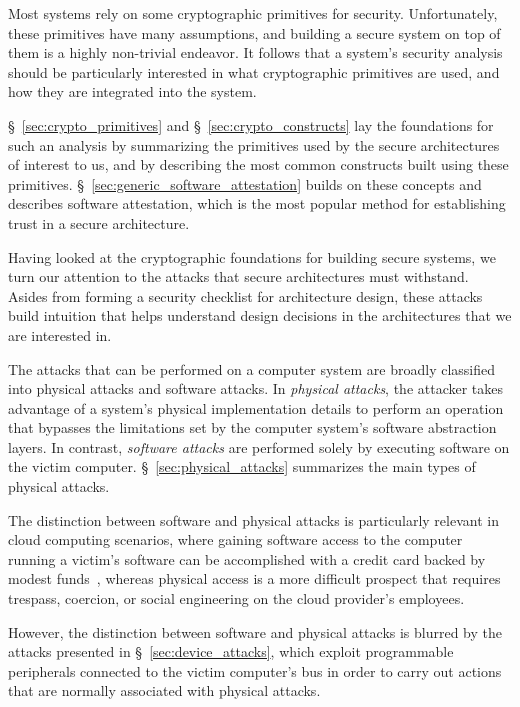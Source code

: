 \label{sec:security_background}

Most systems rely on some cryptographic primitives for security. Unfortunately,
these primitives have many assumptions, and building a secure system on top of
them is a highly non-trivial endeavor. It follows that a system's security
analysis should be particularly interested in what cryptographic primitives are
used, and how they are integrated into the system.

\S~\ref{sec:crypto_primitives} and \S~\ref{sec:crypto_constructs} lay the
foundations for such an analysis by summarizing the primitives used by the
secure architectures of interest to us, and by describing the most
common constructs built using these primitives.
\S~\ref{sec:generic_software_attestation} builds on these concepts and
describes software attestation, which is the most popular method for
establishing trust in a secure architecture.

Having looked at the cryptographic foundations for building secure systems, we
turn our attention to the attacks that secure architectures must withstand.
Asides from forming a security checklist for architecture design, these attacks
build intuition that helps understand design decisions in the architectures
that we are interested in.

The attacks that can be performed on a computer system are broadly classified
into physical attacks and software attacks. In \textit{physical attacks}, the
attacker takes advantage of a system's physical implementation details to
perform an operation that bypasses the limitations set by the computer
system's software abstraction layers. In contrast, \textit{software attacks}
are performed solely by executing software on the victim computer.
\S~\ref{sec:physical_attacks} summarizes the main types of physical attacks.

The distinction between software and physical attacks is particularly relevant
in cloud computing scenarios, where gaining software access to the computer
running a victim's software can be accomplished with a credit card backed by
modest funds~\cite{ristenpart2009colocation}, whereas physical access is a
more difficult prospect that requires trespass, coercion, or social engineering
on the cloud provider's employees.

However, the distinction between software and physical attacks is blurred by
the attacks presented in \S~\ref{sec:device_attacks}, which exploit
programmable peripherals connected to the victim computer's bus in order to
carry out actions that are normally associated with physical attacks.

